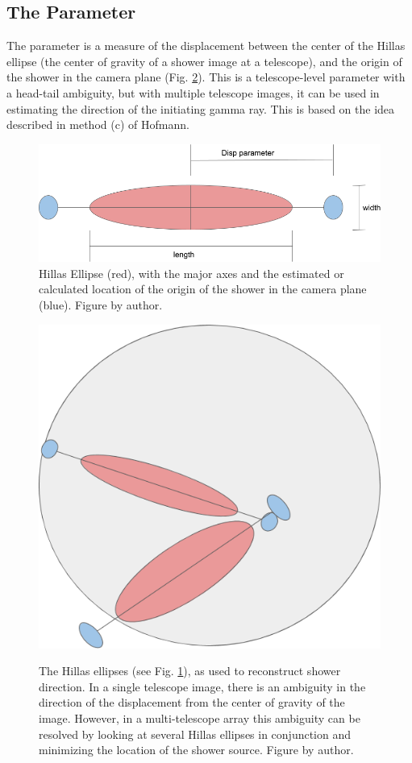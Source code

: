 \documentclass[main.tex]{subfiles}
\begin{document}

\subsection{The \disp Parameter}
The \disp parameter is a measure of the displacement between the center of the Hillas ellipse (the center of gravity of a shower image at a telescope), and the origin of the shower in the camera plane (Fig. \ref{fig:Disp_FOV}). This is a telescope-level parameter with a head-tail ambiguity, but with multiple telescope images, it can be used in estimating the direction of the initiating gamma ray. This is based on the idea described in method (c) of Hofmann\cite{Hofmann:1999dx}.
\begin{figure}[htbp]
  \centering
  \includegraphics[width=.58\linewidth]{images/Disp_param}
  \caption[The Hillas ellipse.]{Hillas Ellipse (red), with the major axes and the estimated or calculated location of the origin of the shower in the camera plane (blue). Figure by author.}
  \label{fig:hillas_ellipse}
\end{figure}

\begin{figure}[H]
  \begin{center}
      \includegraphics[width=0.48\linewidth]{images/Disp_FOV}
      \label{fig:Disp_FOV}
  \end{center}
  \caption[The Disp Parameter.]{The Hillas ellipses (see Fig. \ref{fig:hillas_ellipse}), as used to reconstruct shower direction. In a single telescope image, there is an ambiguity in the direction of the displacement from the center of gravity of the image. However, in a multi-telescope array this ambiguity can be resolved by looking at several Hillas ellipses in conjunction and minimizing the location of the shower source. Figure by author.}
  \label{fig:Disp_FOV}
\end{figure}

\end{document}
